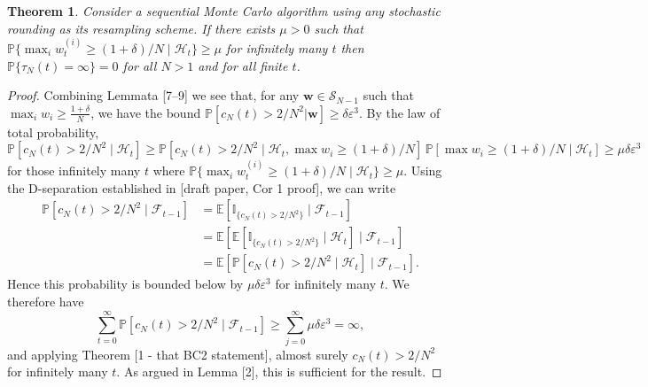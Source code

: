 \documentclass{article}
\newtheorem{thm}{Theorem}
\newcommand{\PR}{\mathbb{P}}
\newcommand{\E}{\mathbb{E}}
\newcommand{\I}[1]{\mathbb{I}_{\{#1\}}}
\begin{document}
\begin{thm}
Consider a sequential Monte Carlo algorithm using any stochastic rounding as its resampling scheme.
If there exists $\mu>0$ such that $\PR\{\max_i w_t^{(i)} \geq (1+\delta)/N \mid \mathcal{H}_t\} \geq \mu$ for infinitely many $t$ then $\PR\{\tau_N(t) = \infty \}=0$ for all $N>1$ and for all finite $t$.
\end{thm}

\begin{proof}
Combining Lemmata [7--9] we see that, for any $\mathbf{w} \in \mathcal{S}_{N-1}$ such that $\max_i w_i \geq \frac{1 + \delta}{N}$, we have the bound $\PR[ c_N(t) > 2/N^2 | \mathbf{w} ] \geq \delta\varepsilon^3$.
By the law of total probability,
\begin{equation*}
\PR[c_N(t) > 2/N^2 \mid \mathcal{H}_t] 
\geq \PR[c_N(t) > 2/N^2 \mid \mathcal{H}_t, \max w_i \geq (1+\delta)/N ]\, \PR[\max w_i \geq (1+\delta)/N \mid \mathcal{H}_t]
\geq \mu \delta \varepsilon^3 
\end{equation*}
for those infinitely many $t$ where $\PR\{\max_i w_t^{(i)} \geq (1+\delta)/N \mid \mathcal{H}_t\} \geq \mu$.
Using the D-separation established in [draft paper, Cor 1 proof], we can write
\begin{align*}
\PR[c_N(t) > 2/N^2 \mid \mathcal{F}_{t-1}] 
&= \E[ \I{c_N(t) > 2/N^2} \mid \mathcal{F}_{t-1}] \\
&= \E[ \E[ \I{c_N(t) > 2/N^2} \mid \mathcal{H}_t ]\mid \mathcal{F}_{t-1}] \\
&= \E[ \PR[c_N(t) > 2/N^2 \mid \mathcal{H}_t ]\mid \mathcal{F}_{t-1}] .
\end{align*}
Hence this probability is bounded below by $\mu\delta\varepsilon^3$ for infinitely many $t$. We therefore have
\begin{equation}
\sum_{t=0}^\infty \PR[c_N(t) > 2/N^2 \mid \mathcal{F}_{t-1}]  \geq \sum_{j=0}^\infty \mu\delta\varepsilon^3 = \infty ,
\end{equation}
and applying Theorem [1 - that BC2 statement], almost surely $c_N(t) >2/N^2$ for infinitely many $t$.
As argued in Lemma [2], this is sufficient for the result.
\end{proof}
\end{document}
